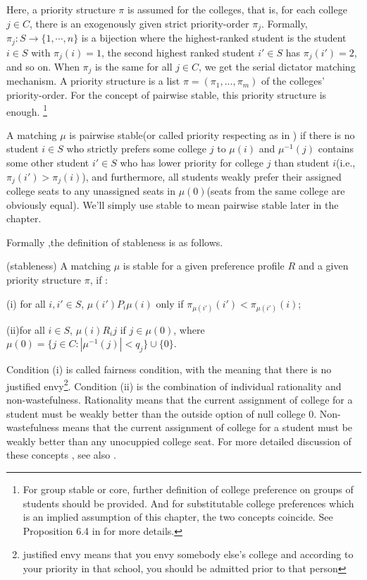  Here, a priority structure $\pi$ is assumed for the colleges, that is, for each college $j \in C$, there is an exogenously given strict priority-order $\pi_j$. Formally, $\pi_j: S \rightarrow \{1,\cdots,n\}$ is a bijection where the highest-ranked student  is the student $i\in S$ with $\pi_j(i)=1$, the second highest ranked student $i' \in S$ has $\pi_j(i')=2$, and so on. When $\pi_j$ is the same for all $j\in C$, we get the serial dictator matching mechanism. A priority structure is a list $ \pi = (\pi_1,...,\pi_m)$ of the colleges' priority-order. For the concept of pairwise stable, this priority structure is enough. \footnote{For group stable or core, further definition of college preference on groups of students should be provided. And for substitutable college preferences which is an implied assumption of this chapter, the two concepts coincide. See Proposition 6.4 in \parencite{Roth1990} for more details.}

 A matching $\mu$ is pairwise stable(or called priority respecting as in \parencite{Svensson2014}) if there is no student $i \in S$ who strictly prefers some college $j$ to $\mu(i)$ and $\mu^{-1}(j)$ contains some other student $i' \in S$ who has lower priority for college $j$ than student $i$(i.e., $\pi_j(i')>\pi_j(i)$), and furthermore, all students weakly prefer their assigned college seats to any unassigned seats in $\mu(0)$(seats from the same college are obviously equal). We'll simply use stable to mean pairwise stable later in the chapter.

 Formally ,the definition of stableness is as follows.

\begin{definition*}(stableness)
A matching $\mu$ is stable for a given preference profile $R$ and a given priority structure $\pi$, if :

(i) for all $i,i' \in S$, $\mu(i')P_i \mu(i)$ only if $\pi_{\mu(i')}(i') < \pi_{\mu(i')}(i)$;

(ii)for all $i \in S$, $\mu(i)R_i j$ if $j \in \mu(0)$, where $\mu(0) = \{j \in C : |\mu^{-1}(j)| < q_j\}\cup \{0\}$.

\end{definition*}

Condition (i) is called fairness condition, with the meaning that
there is no justified envy\footnote{justified envy means that you envy somebody
else's college and according to your priority in that school, you
should be admitted prior to that person}. Condition (ii) is the combination of
individual rationality and non-wastefulness. Rationality means that
the current assignment of college for a student must be weakly better than the outside
option of null college 0. Non-wastefulness means that the current
assignment of college for a student  must be weakly better than any
unocuppied college seat. For more detailed discussion of these concepts
, see also \parencite{Sonmez1999}. 

